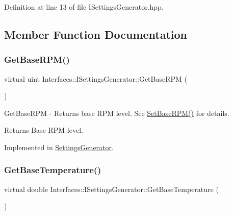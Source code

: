 Definition at line 13 of file I\+Settings\+Generator.\+hpp.



\subsection{Member Function Documentation}
\mbox{\label{class_interfaces_1_1_i_settings_generator_ad088253da57b2ee0b94fe6fd1fb2dfdd}} 
\subsubsection{\texorpdfstring{Get\+Base\+R\+P\+M()}{GetBaseRPM()}}
{\footnotesize\ttfamily virtual uint Interfaces\+::\+I\+Settings\+Generator\+::\+Get\+Base\+R\+PM (\begin{DoxyParamCaption}{ }\end{DoxyParamCaption})\hspace{0.3cm}{\ttfamily [pure virtual]}}



Get\+Base\+R\+PM -\/ Returns base R\+PM level. See \hyperlink{class_interfaces_1_1_i_settings_generator_a4caf07447d0930440d9f21318892244c}{Set\+Base\+R\+P\+M()} for details. 

\begin{DoxyReturn}{Returns}
Base R\+PM level. 
\end{DoxyReturn}


Implemented in \hyperlink{class_settings_generator_a99bbe6e67e638ccc7bf6b21b3bc36135}{Settings\+Generator}.

\mbox{\label{class_interfaces_1_1_i_settings_generator_a9cc36185b446f21e09a0e5633f39a1c5}} 
\subsubsection{\texorpdfstring{Get\+Base\+Temperature()}{GetBaseTemperature()}}
{\footnotesize\ttfamily virtual double Interfaces\+::\+I\+Settings\+Generator\+::\+Get\+Base\+Temperature (\begin{DoxyParamCaption}{ }\end{DoxyParamCaption})\hspace{0.3cm}{\ttfamily [pure virtual]}}



